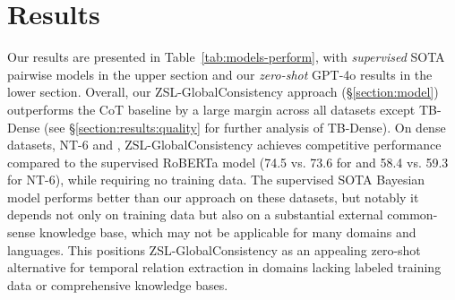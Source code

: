 \section{Results}
\label{section:results}








Our results are presented in Table~\ref{tab:models-perform},  with \textit{supervised} SOTA pairwise models in the upper section and our \textit{zero-shot} GPT-4o results in the lower section. Overall, our ZSL-GlobalConsistency approach (§\ref{section:model}) outperforms the CoT baseline \cite{yuan-etal-2023-zero} by a large margin across all datasets except TB-Dense (see §\ref{section:results:quality} for further analysis of TB-Dense). On dense datasets, NT-6 and \App{}, ZSL-GlobalConsistency achieves competitive performance compared to the supervised RoBERTa model (74.5 vs. 73.6 for \App{} and 58.4 vs. 59.3 for NT-6), while requiring no training data. The supervised SOTA Bayesian model performs better than our approach on these datasets, but notably it depends not only on training data but also on a substantial external common-sense knowledge base, which may not be applicable for many domains and languages.
This positions ZSL-GlobalConsistency as an appealing zero-shot alternative for temporal relation extraction in domains lacking labeled training data or comprehensive knowledge bases.


